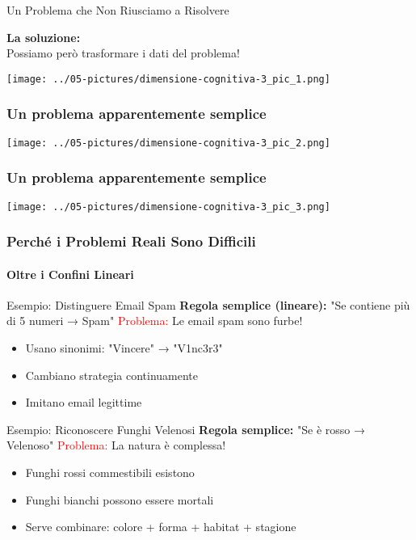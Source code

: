 \documentclass[aspectratio=169]{beamer}
\begin{document}
%
%
\begin{frame}{Un Problema che Non Riusciamo a Risolvere}

\textbf{La soluzione:}\\
Possiamo però trasformare i dati del problema!
\begin{center}
\texttt{[image: ../05-pictures/dimensione-cognitiva-3\_pic\_1.png]} 
\end{center}
\end{frame}
%
%
\begin{frame}
\frametitle{Un problema apparentemente semplice}
\begin{center}
\texttt{[image: ../05-pictures/dimensione-cognitiva-3\_pic\_2.png]} 
\end{center}
\end{frame}
%
%
\begin{frame}
\frametitle{Un problema apparentemente semplice}
\begin{center}
\texttt{[image: ../05-pictures/dimensione-cognitiva-3\_pic\_3.png]} 
\end{center}
\end{frame}
%
%
\begin{frame}
\frametitle{Perché i Problemi Reali Sono Difficili}
\framesubtitle{Oltre i Confini Lineari}
\small
\begin{block}{Esempio: Distinguere Email Spam}
\textbf{Regola semplice (lineare):} "Se contiene più di 5 numeri → Spam"
\textcolor{red}{Problema:} Le email spam sono furbe!
\begin{itemize}
    \item Usano sinonimi: "Vincere" → "V1nc3r3"
    \item Cambiano strategia continuamente
    \item Imitano email legittime
\end{itemize}
\end{block}

\begin{block}{Esempio: Riconoscere Funghi Velenosi}
\textbf{Regola semplice:} "Se è rosso → Velenoso"
\textcolor{red}{Problema:} La natura è complessa!
\begin{itemize}
    \item Funghi rossi commestibili esistono
    \item Funghi bianchi possono essere mortali
    \item Serve combinare: colore + forma + habitat + stagione
\end{itemize}
\end{block}
\end{frame}
%
\end{document}
